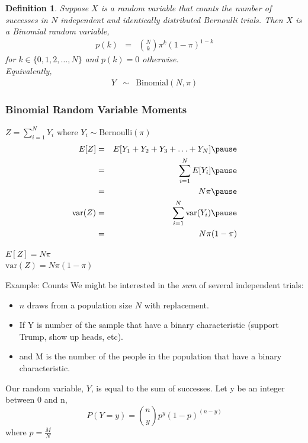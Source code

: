 \documentclass{beamer}
\newtheorem{defn}{Definition}
\numberwithin{equation}{section}
\begin{document}
\begin{frame}
\begin{defn}
Suppose $X$ is a random variable that counts the number of successes in $N$ independent and identically distributed Bernoulli trials.  Then $X$ is a \alert{Binomial} random variable, 
\begin{eqnarray}
p(k) & = & {{N}\choose{k}}\pi^{k} (1- \pi)^{1-k} \nonumber 
\end{eqnarray}
for $k \in \{0, 1, 2, \hdots, N\}$ and $p(k) = 0$ otherwise.  \\
Equivalently, 
\begin{eqnarray}
Y & \sim & \text{Binomial}(N, \pi) \nonumber 
\end{eqnarray}

\end{defn}

\end{frame}


\begin{frame}
\frametitle{Binomial Random Variable \alert{Moments}}
$Z = \sum_{i=1}^{N} Y_{i}$ where $Y_{i} \sim \text{Bernoulli}(\pi)$ \pause \\
\begin{eqnarray}
E[Z] & = & E[Y_{1} + Y_{2} + Y_{3} + \hdots + Y_{N} ] \nonumber \pause \\
& = & \sum_{i=1}^{N} E[Y_{i} ] \nonumber  \pause\\
& = & N \pi \nonumber  \pause\\
\text{var}(Z) & = & \sum_{i=1}^{N} \text{var}(Y_{i}) \nonumber \pause \\
& = & N \pi (1-\pi) \nonumber 
 \end{eqnarray}




$E[Z]  =   N \pi$ \\
$\text{var}(Z)  =  N \pi (1- \pi) \nonumber $



\end{frame}



\begin{frame}{Example: Counts}
We might be interested in the \emph{sum} of several independent trials:\pause
\begin{itemize}
\item $n$ draws from a population size $N$ with replacement.
\item If Y is number of the sample that have a binary characteristic (support Trump, show up heads, etc).
\item and M is the number of the people in the population that have a binary characteristic.
\end{itemize}
Our random variable, $Y$, is equal to the sum of successes.
\pause
Let y be an integer between 0 and n,
$$P(Y=y)={n\choose y} p^y(1-p)^{(n-y)}$$
where $p=\frac{M}{N}$

\end{frame}
\end{document}
